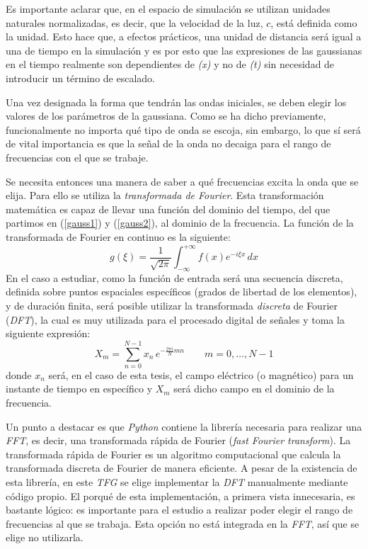 \documentclass[11pt,a4paper,twoside,pdf]{article}
\numberwithin{equation}{section}
\begin{document}
Es importante aclarar que, en el espacio de simulación se utilizan unidades naturales normalizadas, es decir, que la velocidad de la luz, $c$, está definida como la unidad. Esto hace que, a efectos prácticos, una unidad de distancia será igual a una de tiempo en la simulación y es por esto que las expresiones de las gaussianas en el tiempo realmente son dependientes de \textit{(x)} y no de \textit{(t)} sin necesidad de introducir un término de escalado.

Una vez designada la forma que tendrán las ondas iniciales, se deben elegir los valores de los parámetros de la gaussiana.  Como se ha dicho previamente, funcionalmente no importa qué tipo de onda se escoja, sin embargo, lo que sí será de vital importancia es que la señal de la onda no decaiga para el rango de frecuencias con el que se trabaje.

Se necesita entonces una manera de saber a qué frecuencias excita la onda que se elija. Para ello se utiliza la \textit{transformada de Fourier}. Esta transformación matemática es capaz de llevar una función del dominio del tiempo, del que partimos en (\ref{gauss1}) y (\ref{gauss2}), al dominio de la frecuencia. La función de la transformada de Fourier en continuo es la siguiente:
\begin{equation}
    g(\xi) = \frac{1}{\sqrt{2\pi}} \int_{-\infty}^{+\infty} f(x) e^{-i \xi x} \, dx
\end{equation}
En el caso a estudiar, como la función de entrada será una secuencia discreta, definida sobre puntos espaciales específicos (grados de libertad de los elementos), y de duración finita, será posible utilizar la transformada \textit{discreta} de Fourier (\textit{DFT}), la cual es muy utilizada para el procesado digital de señales y toma la siguiente expresión:
\begin{equation}
    X_m = \sum_{n=0}^{N-1} x_n \, e^{- \frac{2\pi i}{N} mn} \qquad m = 0, \ldots, N-1\label{DFT}
\end{equation}
donde $x_n$ será, en el caso de esta tesis, el campo eléctrico (o magnético) para un instante de tiempo en específico y $X_m$ será dicho campo en el dominio de la frecuencia.

Un punto a destacar es que \textit{Python} contiene la librería necesaria para realizar una \textit{FFT}, es decir, una transformada rápida de Fourier (\textit{fast Fourier transform}). La transformada rápida de Fourier es un algoritmo computacional que calcula la transformada discreta de Fourier de manera eficiente. A pesar de la existencia de esta librería, en este \textit{TFG} se elige implementar la \textit{DFT} manualmente mediante código propio. El porqué de esta implementación, a primera vista innecesaria, es bastante lógico: es importante para el estudio a realizar poder elegir el rango de frecuencias al que se trabaja. Esta opción no está integrada en la \textit{FFT}, así que se elige no utilizarla. 
\end{document}
